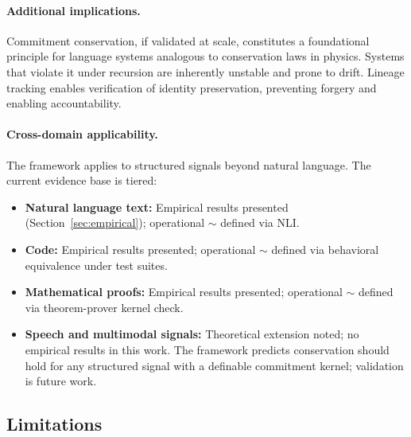 \documentclass[11pt,a4paper]{article}
\begin{document}
\paragraph{Additional implications.}
Commitment conservation, if validated at scale, constitutes a foundational principle for language systems analogous to conservation laws in physics. Systems that violate it under recursion are inherently unstable and prone to drift. Lineage tracking enables verification of identity preservation, preventing forgery and enabling accountability.

\paragraph{Cross-domain applicability.}
The framework applies to structured signals beyond natural language. The current evidence base is tiered:
\begin{itemize}
    \item \textbf{Natural language text:} Empirical results presented (Section~\ref{sec:empirical}); operational $\sim$ defined via NLI.
    \item \textbf{Code:} Empirical results presented; operational $\sim$ defined via behavioral equivalence under test suites.
    \item \textbf{Mathematical proofs:} Empirical results presented; operational $\sim$ defined via theorem-prover kernel check.
    \item \textbf{Speech and multimodal signals:} Theoretical extension noted; no empirical results in this work. The framework predicts conservation should hold for any structured signal with a definable commitment kernel; validation is future work.
\end{itemize}

\subsection{Limitations}
\end{document}
